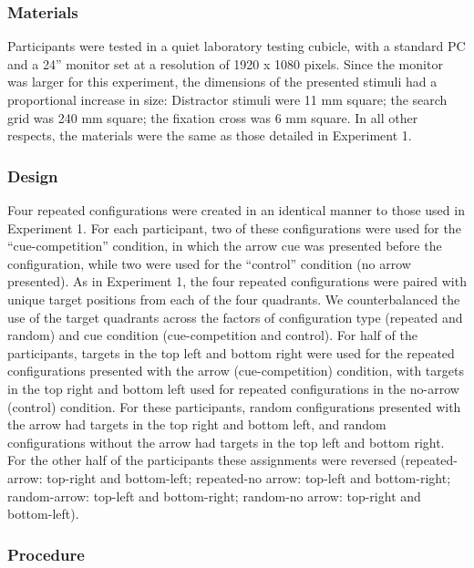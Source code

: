 \documentclass[
  man,
  floatsintext,
  longtable,
  nolmodern,
  notxfonts,
  notimes,
  colorlinks=true,linkcolor=blue,citecolor=blue,urlcolor=blue]{apa7}
\begin{document}
\subsubsection{Materials}\label{materials-1}

Participants were tested in a quiet laboratory testing cubicle, with a
standard PC and a 24'' monitor set at a resolution of 1920 x 1080
pixels. Since the monitor was larger for this experiment, the dimensions
of the presented stimuli had a proportional increase in size: Distractor
stimuli were 11 mm square; the search grid was 240 mm square; the
fixation cross was 6 mm square. In all other respects, the materials
were the same as those detailed in Experiment 1.

\subsubsection{Design}\label{design-1}

Four repeated configurations were created in an identical manner to
those used in Experiment 1. For each participant, two of these
configurations were used for the ``cue-competition'' condition, in which
the arrow cue was presented before the configuration, while two were
used for the ``control'' condition (no arrow presented). As in
Experiment 1, the four repeated configurations were paired with unique
target positions from each of the four quadrants. We counterbalanced the
use of the target quadrants across the factors of configuration type
(repeated and random) and cue condition (cue-competition and control).
For half of the participants, targets in the top left and bottom right
were used for the repeated configurations presented with the arrow
(cue-competition) condition, with targets in the top right and bottom
left used for repeated configurations in the no-arrow (control)
condition. For these participants, random configurations presented with
the arrow had targets in the top right and bottom left, and random
configurations without the arrow had targets in the top left and bottom
right. For the other half of the participants these assignments were
reversed (repeated-arrow: top-right and bottom-left; repeated-no arrow:
top-left and bottom-right; random-arrow: top-left and bottom-right;
random-no arrow: top-right and bottom-left).

\subsubsection{Procedure}\label{procedure-1}
\end{document}
